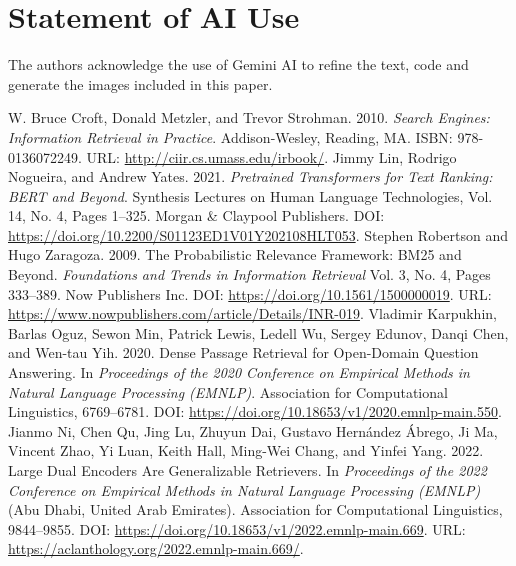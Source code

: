 \documentclass[sigconf,anonymous,screen]{acmart}
\begin{document}
\section*{Statement of AI Use}
The authors acknowledge the use of Gemini AI to refine the text, code and generate the images included in this paper.
\vspace{-8pt}
\setlength{\bibsep}{0.0pt plus 0.3pt}
\footnotesize
\let\oldthebibliography\thebibliography
\let\oldendthebibliography\endthebibliography
\renewenvironment{thebibliography}[1]{%
  \oldthebibliography{#1}%
  \setlength{\itemsep}{0.0pt}%
  \setlength{\parsep}{0.0pt}%
}{%
  \oldendthebibliography
}
\begin{thebibliography}{99}
 W. Bruce Croft, Donald Metzler, and Trevor Strohman. 2010. \textit{Search Engines: Information Retrieval in Practice}. Addison-Wesley, Reading, MA. ISBN: 978-0136072249. URL: \url{http://ciir.cs.umass.edu/irbook/}.
 Jimmy Lin, Rodrigo Nogueira, and Andrew Yates. 2021. \textit{Pretrained Transformers for Text Ranking: BERT and Beyond}. Synthesis Lectures on Human Language Technologies, Vol. 14, No. 4, Pages 1--325. Morgan \& Claypool Publishers. DOI: \url{https://doi.org/10.2200/S01123ED1V01Y202108HLT053}.
 Stephen Robertson and Hugo Zaragoza. 2009. The Probabilistic Relevance Framework: BM25 and Beyond. \textit{Foundations and Trends in Information Retrieval} Vol. 3, No. 4, Pages 333--389. Now Publishers Inc. DOI: \url{https://doi.org/10.1561/1500000019}. URL: \url{https://www.nowpublishers.com/article/Details/INR-019}.
 Vladimir Karpukhin, Barlas Oguz, Sewon Min, Patrick Lewis, Ledell Wu, Sergey Edunov, Danqi Chen, and Wen-tau Yih. 2020. Dense Passage Retrieval for Open-Domain Question Answering. In \textit{Proceedings of the 2020 Conference on Empirical Methods in Natural Language Processing (EMNLP)}. Association for Computational Linguistics, 6769--6781. DOI: \url{https://doi.org/10.18653/v1/2020.emnlp-main.550}.
 Jianmo Ni, Chen Qu, Jing Lu, Zhuyun Dai, Gustavo Hern\'{a}ndez \'{A}brego, Ji Ma, Vincent Zhao, Yi Luan, Keith Hall, Ming-Wei Chang, and Yinfei Yang. 2022. Large Dual Encoders Are Generalizable Retrievers. In \textit{Proceedings of the 2022 Conference on Empirical Methods in Natural Language Processing (EMNLP)} (Abu Dhabi, United Arab Emirates). Association for Computational Linguistics, 9844--9855. DOI: \url{https://doi.org/10.18653/v1/2022.emnlp-main.669}. URL: \url{https://aclanthology.org/2022.emnlp-main.669/}.

\end{thebibliography}
\end{document}
